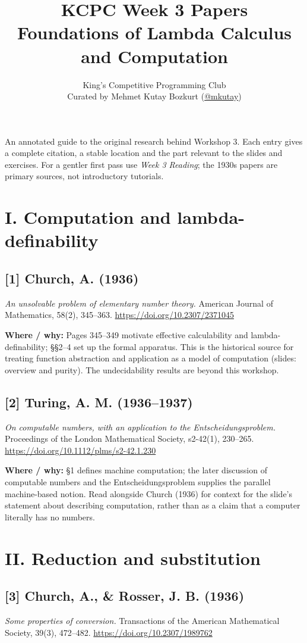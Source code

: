 \documentclass[11pt]{article}
\title{KCPC Week 3 Papers\\Foundations of Lambda Calculus and Computation}
\author{King's Competitive Programming Club\\
  \small Curated by Mehmet Kutay Bozkurt (\href{https://github.com/mkutay}{@mkutay})}\date{}
\begin{document}
\maketitle\thispagestyle{fancy}

An annotated guide to the original research behind Workshop 3. Each entry gives a complete citation, a stable location and the part relevant to the slides and exercises. For a gentler first pass use \emph{Week 3 Reading}; the 1930s papers are primary sources, not introductory tutorials.

\section*{I. Computation and lambda-definability}
\subsection*{[1] Church, A. (1936)}
\textit{An unsolvable problem of elementary number theory.} American Journal of Mathematics, 58(2), 345--363.
\url{https://doi.org/10.2307/2371045}

\textbf{Where / why:} Pages 345--349 motivate effective calculability and lambda-definability; \S\S2--4 set up the formal apparatus. This is the historical source for treating function abstraction and application as a model of computation (slides: overview and purity). The undecidability results are beyond this workshop.

\subsection*{[2] Turing, A. M. (1936--1937)}
\textit{On computable numbers, with an application to the Entscheidungsproblem.} Proceedings of the London Mathematical Society, s2-42(1), 230--265.
\url{https://doi.org/10.1112/plms/s2-42.1.230}

\textbf{Where / why:} \S1 defines machine computation; the later discussion of computable numbers and the Entscheidungsproblem supplies the parallel machine-based notion. Read alongside Church (1936) for context for the slide's statement about describing computation, rather than as a claim that a computer literally has no numbers.

\section*{II. Reduction and substitution}
\subsection*{[3] Church, A., \& Rosser, J. B. (1936)}
\textit{Some properties of conversion.} Transactions of the American Mathematical Society, 39(3), 472--482.
\url{https://doi.org/10.2307/1989762}
\end{document}
